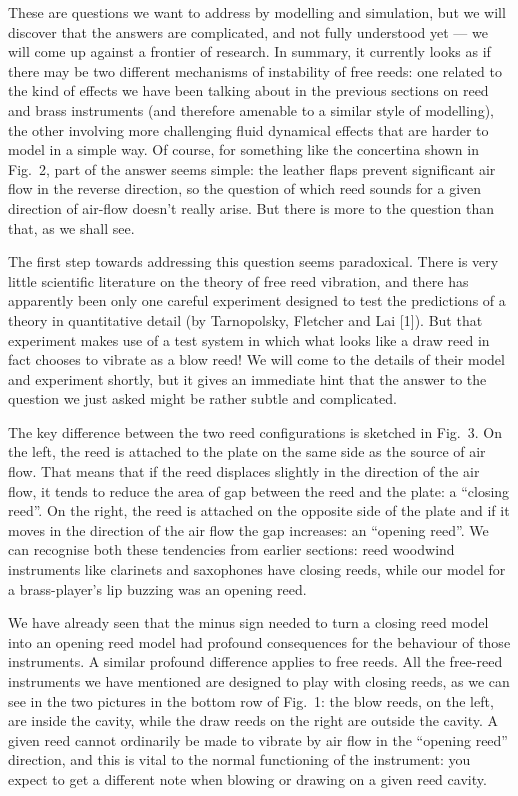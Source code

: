   These are questions we want to address by modelling and simulation, but we 
  will discover that the answers are complicated, and not fully understood yet 
  --- we will come up against a frontier of research. In summary, it currently 
  looks as if there may be two different mechanisms of instability of free 
  reeds: one related to the kind of effects we have been talking about in the 
  previous sections on reed and brass instruments (and therefore amenable to a 
  similar style of modelling), the other involving more challenging fluid 
  dynamical effects that are harder to model in a simple way. Of course, for 
  something like the concertina shown in Fig.\ 2, part of the answer seems 
  simple: the leather flaps prevent significant air flow in the reverse 
  direction, so the question of which reed sounds for a given direction of 
  air-flow doesn't really arise. But there is more to the question than that, 
  as we shall see. 

  The first step towards addressing this question seems paradoxical. There is 
  very little scientific literature on the theory of free reed vibration, and 
  there has apparently been only one careful experiment designed to test the 
  predictions of a theory in quantitative detail (by Tarnopolsky, Fletcher and 
  Lai [1]). But that experiment makes use of a test system in which what looks 
  like a draw reed in fact chooses to vibrate as a blow reed! We will come to 
  the details of their model and experiment shortly, but it gives an immediate 
  hint that the answer to the question we just asked might be rather subtle and 
  complicated. 

  The key difference between the two reed configurations is sketched in Fig.\ 
  3. On the left, the reed is attached to the plate on the same side as the 
  source of air flow. That means that if the reed displaces slightly in the 
  direction of the air flow, it tends to reduce the area of gap between the 
  reed and the plate: a “closing reed”. On the right, the reed is attached on 
  the opposite side of the plate and if it moves in the direction of the air 
  flow the gap increases: an “opening reed”. We can recognise both these 
  tendencies from earlier sections: reed woodwind instruments like clarinets 
  and saxophones have closing reeds, while our model for a brass-player’s lip 
  buzzing was an opening reed. 

  We have already seen that the minus sign needed to turn a closing reed model 
  into an opening reed model had profound consequences for the behaviour of 
  those instruments. A similar profound difference applies to free reeds. All 
  the free-reed instruments we have mentioned are designed to play with closing 
  reeds, as we can see in the two pictures in the bottom row of Fig.\ 1: the 
  blow reeds, on the left, are inside the cavity, while the draw reeds on the 
  right are outside the cavity. A given reed cannot ordinarily be made to 
  vibrate by air flow in the ``opening reed'' direction, and this is vital to 
  the normal functioning of the instrument: you expect to get a different note 
  when blowing or drawing on a given reed cavity. 


